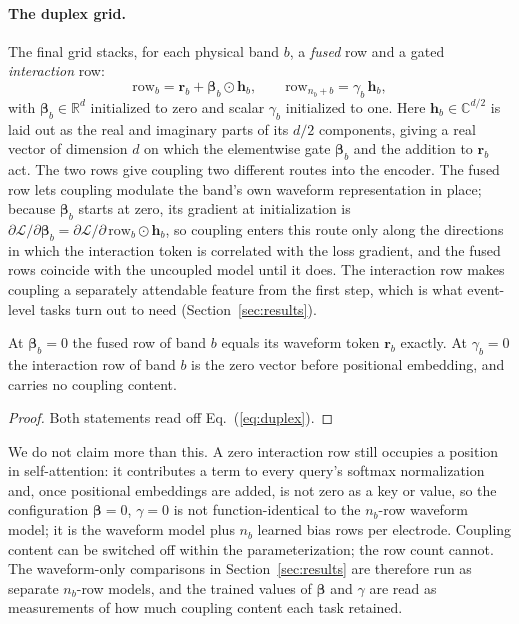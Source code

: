 \paragraph{The duplex grid.}
The final grid stacks, for each physical band $b$, a \emph{fused} row and
a gated \emph{interaction} row:
\begin{equation}
\text{row}_b = \mathbf{r}_b + \boldsymbol{\beta}_b \odot \mathbf{h}_b, \qquad
\text{row}_{n_b + b} = \gamma_b\, \mathbf{h}_b,
\label{eq:duplex}
\end{equation}
with $\boldsymbol{\beta}_b \in \mathbb{R}^d$ initialized to zero and scalar
$\gamma_b$ initialized to one. Here $\mathbf{h}_b \in \mathbb{C}^{d/2}$ is
laid out as the real and imaginary parts of its $d/2$ components, giving
a real vector of dimension $d$ on which the elementwise gate
$\boldsymbol{\beta}_b$ and the addition to $\mathbf{r}_b$ act. The two rows give coupling two different
routes into the encoder. The fused row lets coupling modulate the band's
own waveform representation in place; because $\boldsymbol{\beta}_b$
starts at zero, its gradient at initialization is
$\partial\mathcal{L}/\partial\boldsymbol{\beta}_b =
\partial\mathcal{L}/\partial\,\text{row}_b \odot \mathbf{h}_b$, so
coupling enters this route only along the directions in which the
interaction token is correlated with the loss gradient, and the fused rows
coincide with the uncoupled model until it does. The interaction row makes
coupling a separately attendable feature from the first step, which is what
event-level tasks turn out to need (Section~\ref{sec:results}).

\begin{proposition}[Gating]
\label{prop:recover}
At $\boldsymbol{\beta}_b = 0$ the fused row of band $b$ equals its waveform
token $\mathbf{r}_b$ exactly. At $\gamma_b = 0$ the interaction row of
band $b$ is the zero vector before positional embedding, and carries no
coupling content.
\end{proposition}
\begin{proof}
Both statements read off Eq.~(\ref{eq:duplex}).
\end{proof}

We do not claim more than this. A zero interaction row still occupies a
position in self-attention: it contributes a term to every query's
softmax normalization and, once positional embeddings are added, is not
zero as a key or value, so the configuration $\boldsymbol{\beta} = 0$,
$\gamma = 0$ is not function-identical to the $n_b$-row waveform model;
it is the waveform model plus $n_b$ learned bias rows per electrode.
Coupling content can be switched off within the parameterization; the
row count cannot. The waveform-only comparisons in
Section~\ref{sec:results} are therefore run as separate $n_b$-row models,
and the trained values of $\boldsymbol{\beta}$ and $\gamma$ are read as
measurements of how much coupling content each task retained.

